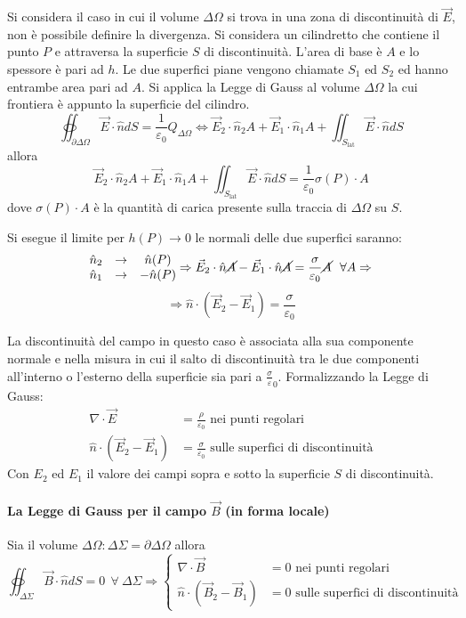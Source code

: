 Si considera il caso in cui il volume $\Delta\Omega$ si trova in una zona di discontinuità
di $\vec{E}$, non è possibile definire la divergenza.
Si considera un cilindretto che contiene il punto $P$ e attraversa la superficie $S$ di discontinuità.
L'area di base è $A$ e lo spessore è pari ad $h$.
Le due superfici piane vengono chiamate $S_1$ ed $S_2$ ed hanno entrambe area pari ad $A$.
Si applica la Legge di Gauss al volume $\Delta\Omega$ la cui frontiera è appunto la superficie del 
cilindro.
$$
\oiint_{\partial\Delta\Omega} \vec{E}\cdot\hat{n}dS = \frac{1}{\varepsilon_0}Q_{\Delta\Omega} \Leftrightarrow \vec{E}_2\cdot\hat{n}_2A + \vec{E}_1\cdot\hat{n}_1A + 
\iint_{S_{\text{lat}}}\vec{E}\cdot\hat{n}dS
$$
allora
$$
\vec{E}_2\cdot\hat{n}_2A + \vec{E}_1\cdot\hat{n}_1A + 
\iint_{S_{\text{lat}}}\vec{E}\cdot\hat{n}dS = \frac{1}{\varepsilon_0} \sigma(P)\cdot A
$$
dove $\sigma(P)\cdot  A $ è la quantità di carica presente sulla traccia di $\Delta\Omega$ su $S$.

Si esegue il limite per $h(P)\to 0$ le normali delle due superfici saranno:
$$
\begin{matrix}
\hat{n}_2 & \to& \hat{n}(P) \\
\hat{n}_1 & \to& -\hat{n}(P)
\end{matrix}
\Rightarrow \vec{E}_2\cdot\hat{n}\cancel{A} - \vec{E}_1\cdot\hat{n}\cancel{A} = \frac{\sigma}{\varepsilon_0}\cancel{A} \ \ \forall A \Rightarrow
$$
$$
\Rightarrow \hat{n}\cdot(\vec{E}_2-\vec{E}_1) = \frac{\sigma}{\varepsilon_0}
$$

La discontinuità del campo in questo caso è associata alla sua componente normale e nella misura 
in cui il salto di discontinuità tra le due componenti all'interno o l'esterno della superficie sia 
pari a $\frac{\sigma}{\varepsilon}_0$.
Formalizzando la Legge di Gauss:
\begin{align*}
\nabla\cdot\vec{E} &= \frac{\rho}{\varepsilon_0}\text{ nei punti regolari}\\
\hat{n}\cdot(\vec{E}_2-\vec{E}_1) &= \frac{\sigma}{\varepsilon_0}
\text{ sulle superfici di discontinuità}
\end{align*}
Con $E_2$ ed $E_1$ il valore dei campi sopra e sotto la superficie $S$ di discontinuità.

\paragraph{La Legge di Gauss per il campo $\vec{B}$ (in forma locale)}
Sia il volume $\Delta\Omega : \Delta\Sigma = \partial\Delta\Omega$ allora
\begin{equation}
\oiint_{\Delta\Sigma}\vec{B}\cdot\hat{n}dS = 0 \ \ \forall\ \Delta \Sigma \Rightarrow
\begin{cases}
\nabla\cdot\vec{B} &= 0\text{ nei punti regolari}\\
\hat{n}\cdot(\vec{B}_2-\vec{B}_1) &= 0 \text{ sulle superfici di discontinuità}
\end{cases}
\end{equation}

